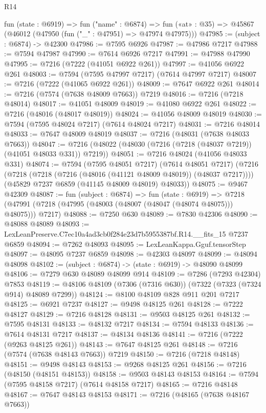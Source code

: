 \begin{lexlean}{R14}
\begin{coremodule}
  fun (state : @6919) =>
  fun ("name" : @6874) =>
  fun («at» : @35) => @45867 (@46012 (@47950 (fun ("_" : @47951) => @47974 @47975)))
@47985 := (subject : @6874) -> @42300
@47986 := @7595 @6926
@47987 := @47986 @7217
@47988 := @7594 @47987
@47990 := @7614 @6926 @7217
@47991 := @47988 @47990
@47995 := @7216 (@7222 (@41051 @6922 @261))
@47997 := @41056 @6922 @261
@48003 := @7594 (@7595 @47997 @7217) (@7614 @47997 @7217)
@48007 := @7216 (@7222 (@41065 @6922 @261))
@48009 := @7647 @6922 @261
@48014 := @7216 (@7574 (@7638 @48009 @7663)) @7219
@48016 := @7216 (@7218 @48014)
@48017 := @41051 @48009
@48019 := @41080 @6922 @261
@48022 := @7216 (@48016 (@48017 @48019))
@48024 := @41056 @48009 @48019
@48030 := @7594 (@7595 @48024 @7217) (@7614 @48024 @7217)
@48031 := @7216 @48014
@48033 := @7647 @48009 @48019
@48037 := @7216 (@48031 (@7638 @48033 @7663))
@48047 := @7216 (@48022 (@48030 (@7216 (@7218 (@48037 @7219)) (@41051 @48033 @331)) @7219))
@48051 := @7216 @48024 (@41056 @48033 @331)
@48074 := @7594
    (@7595 @48051 @7217)
    (@7614 @48051 @7217)
    (@7216
      (@7218 (@7218 (@7216 (@48016 (@41121 @48009 @48019)) (@48037 @7217))))
      (@45829 @7237 @6859 (@41145 @48009 @48019) @48033))
@48075 := @9467 @42309
@48087 := fun (subject : @6874) =>
  fun (state : @6919) =>
  @7218 (@47991 (@7218 (@47995 (@48003 (@48007 (@48047 (@48074 @48075))) @48075))) @7217)
@48088 := @7250 @630
@48089 := @7830 @42306
@48090 := @48088 @48089
@48093 := LexLeanPreserve.C7ec10a4ad3cb0f284e23d7b5955387bf.R14.__fits_15 @7237 @6859
@48094 := @7262 @48093
@48095 := LexLeanKappa.Gguf.tensorStep
@48097 := @48095 @7237 @6859
@48098 := @42303 @48097
@48099 := @48094 @48098
@48102 := (subject : @6874) -> (state : @6919) -> @48090 @48099
@48106 := @7279 @630 @48089 @48099 @914
@48109 := @7286 (@7293 @42304) @7853
@48119 := @48106 @48109 (@7306 (@7316 @630)) (@7322 (@7323 (@7324 @914) @48089 @7299))
@48124 := @8100 @48109 @828 @911 @201 @7217
@48125 := @6921 @7237
@48127 := @9498 @48125 @261
@48128 := @7222 @48127
@48129 := @7216 @48128
@48131 := @9503 @48125 @261
@48132 := @7595 @48131
@48133 := @48132 @7217
@48134 := @7594 @48133
@48136 := @7614 @48131 @7217
@48137 := @48134 @48136
@48141 := @7216 (@7222 (@9263 @48125 @261))
@48143 := @7647 @48125 @261
@48148 := @7216 (@7574 (@7638 @48143 @7663)) @7219
@48150 := @7216 (@7218 @48148)
@48151 := @9498 @48143
@48153 := @9268 @48125 @261
@48156 := @7216 (@48150 (@48151 @48153))
@48158 := @9503 @48143 @48153
@48164 := @7594 (@7595 @48158 @7217) (@7614 @48158 @7217)
@48165 := @7216 @48148
@48167 := @7647 @48143 @48153
@48171 := @7216 (@48165 (@7638 @48167 @7663))

\end{coremodule}
\end{lexlean}
